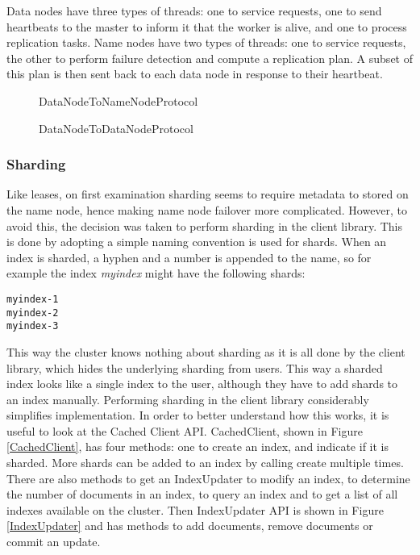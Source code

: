\documentclass[a4paper,10pt]{article}
\begin{document}
Data nodes have three types of threads: one to service requests, one to send heartbeats to the master to inform it that the worker is alive, and one to process replication tasks. Name nodes have two types of threads: one to service requests, the other to perform failure detection and compute a replication plan. A subset of this plan is then sent back to each data node in response to their heartbeat.

\begin{figure}

\caption{DataNodeToNameNodeProtocol}
\label{DataNodeToNameNodeProtocol}
\end{figure}

\begin{figure}

\caption{DataNodeToDataNodeProtocol}
\label{DataNodeToDataNodeProtocol}
\end{figure}

\subsubsection{Sharding}
Like leases, on first examination sharding seems to require metadata to stored on the name node, hence making name node failover more complicated. However, to avoid this, the decision was taken to perform sharding in the client library. This is done by adopting a simple naming convention is used for shards. When an index is sharded, a hyphen and a number is appended to the name, so for example the index \emph{myindex} might have the following shards:

\begin{verbatim}
myindex-1
myindex-2
myindex-3
\end{verbatim}

This way the cluster knows nothing about sharding as it is all done by the client library, which hides the underlying sharding from users. This way a sharded index looks like a single index to the user, although they have to add shards to an index manually. Performing sharding in the client library considerably simplifies implementation. In order to better understand how this works, it is useful to look at the Cached Client API. CachedClient, shown in Figure \ref{CachedClient}, has four methods: one to create an index, and indicate if it is sharded. More shards can be added to an index by calling create multiple times. There are also methods to get an IndexUpdater to modify an index, to determine the number of documents in an index, to query an index and to get a list of all indexes available on the cluster. Then IndexUpdater API is shown in Figure \ref{IndexUpdater} and has methods to add documents, remove documents or commit an update. 
\end{document}
